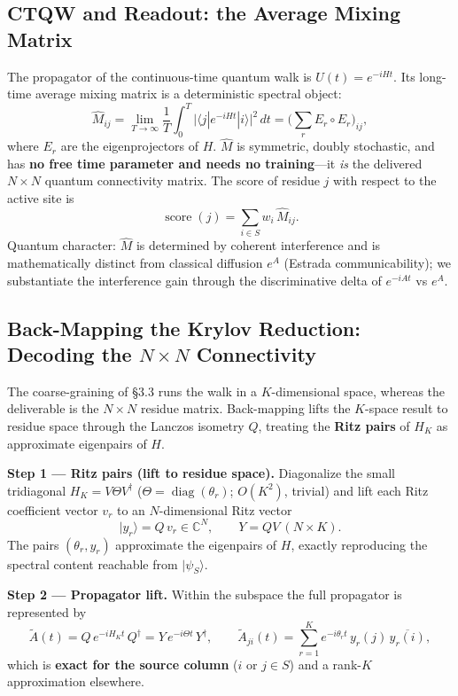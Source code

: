 \documentclass[11pt,a4paper]{article}
\newcommand{\mhat}{\hat{M}}
\newcommand{\lead}[1]{\textbf{#1}}
\newcommand{\note}[1]{{\color{grey}\small #1}}
\begin{document}
\subsection{CTQW and Readout: the Average Mixing Matrix}
The propagator of the continuous-time quantum walk is $U(t)=e^{-iHt}$. Its long-time average mixing matrix is a deterministic spectral object:
\begin{equation*}
\mhat_{ij}=\lim_{T\to\infty}\frac{1}{T}\int_0^{T}\big|\langle j|e^{-iHt}|i\rangle\big|^2\,dt=\Big(\textstyle\sum_r E_r\!\circ\!E_r\Big)_{ij},
\end{equation*}
where $E_r$ are the eigenprojectors of $H$. $\mhat$ is symmetric, doubly stochastic, and has \lead{no free time parameter and needs no training}---it \emph{is} the delivered $N\times N$ quantum connectivity matrix. The score of residue $j$ with respect to the active site is
\begin{equation*}
\operatorname{score}(j)=\sum_{i\in S} w_i\,\mhat_{ij}.
\end{equation*}
\note{Quantum character: $\mhat$ is determined by coherent interference and is mathematically distinct from classical diffusion $e^{A}$ (Estrada communicability); we substantiate the interference gain through the discriminative delta of $e^{-iAt}$ vs $e^{A}$.}

\subsection{Back-Mapping the Krylov Reduction: Decoding the $N\times N$ Connectivity}
The coarse-graining of \S3.3 runs the walk in a $K$-dimensional space, whereas the deliverable is the $N\times N$ residue matrix. Back-mapping lifts the $K$-space result to residue space through the Lanczos isometry $Q$, treating the \lead{Ritz pairs} of $H_K$ as approximate eigenpairs of $H$.

\smallskip
\lead{Step 1 --- Ritz pairs (lift to residue space).} Diagonalize the small tridiagonal $H_K=V\Theta V^{\dagger}$ ($\Theta=\operatorname{diag}(\theta_r)$; $O(K^2)$, trivial) and lift each Ritz coefficient vector $v_r$ to an $N$-dimensional Ritz vector
\begin{equation*}
|y_r\rangle = Q\,v_r\in\mathbb{C}^{N},\qquad Y=QV\ (N\times K).
\end{equation*}
The pairs $(\theta_r,y_r)$ approximate the eigenpairs of $H$, exactly reproducing the spectral content reachable from $|\psi_S\rangle$.

\smallskip
\lead{Step 2 --- Propagator lift.} Within the subspace the full propagator is represented by
\begin{equation*}
\tilde A(t)=Q\,e^{-iH_K t}\,Q^{\dagger}=Y\,e^{-i\Theta t}\,Y^{\dagger},\qquad
\tilde A_{ji}(t)=\sum_{r=1}^{K} e^{-i\theta_r t}\,y_r(j)\,\overline{y_r(i)} ,
\end{equation*}
which is \lead{exact for the source column} ($i$ or $j\in S$) and a rank-$K$ approximation elsewhere.
\end{document}
